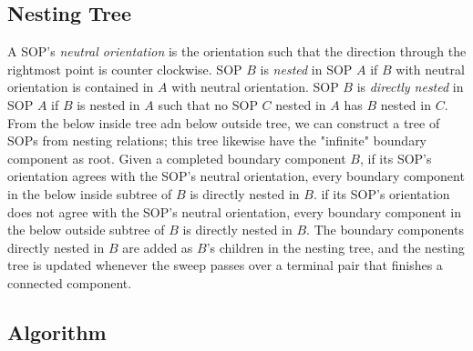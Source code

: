 \documentclass[11pt]{article}
\begin{document}
\subsection{Nesting Tree}
A SOP's \textit{neutral orientation} is the orientation such that the direction through the rightmost point is counter clockwise.
SOP $B$ is \textit{nested} in SOP $A$ if $B$ with neutral orientation is contained in $A$ with neutral orientation.
SOP $B$ is \textit{directly nested} in SOP $A$ if $B$ is nested in $A$ such that no SOP $C$ nested in $A$ has $B$ nested in $C$.
From the below inside tree adn below outside tree, we can construct a tree of SOPs from nesting relations; this tree likewise have the "infinite" boundary component as root.
Given a completed boundary component $B$, if its SOP's orientation agrees with the SOP's neutral orientation, every boundary component in the below inside subtree of $B$ is directly nested in $B$.
if its SOP's orientation does not agree with the SOP's neutral orientation, every boundary component in the below outside subtree of $B$ is directly nested in $B$.
The boundary components directly nested in $B$ are added as $B$'s children in the nesting tree, and the nesting tree is updated whenever the sweep passes over a terminal pair that finishes a connected component.




\subsection{Algorithm}
\end{document}
